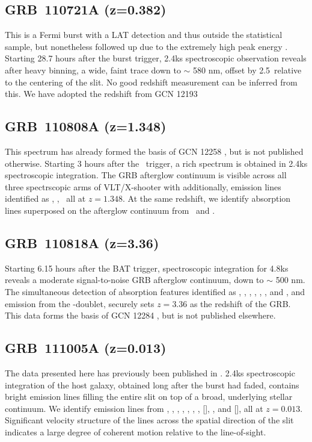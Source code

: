 \documentclass{aa}    %
\begin{document}
\subsection{GRB~110721A (z=0.382)} \label{110721}

This is a Fermi burst with a LAT detection and thus outside the statistical
sample, but nonetheless followed up due to the extremely high peak energy
\citep{Axelsson2012}. Starting 28.7 hours after the burst trigger, 2.4ks
spectroscopic observation reveals after heavy binning, a wide, faint trace down
to $\sim$ 580 nm, offset by 2.5\arcsec~relative to the centering of the slit.
No good redshift measurement can be inferred from this. We have adopted the
redshift from GCN  12193 \citep{GCN12193}


\subsection{GRB~110808A (z=1.348)} \label{110808}

This spectrum has already formed the basis of GCN 12258 \citep{GCN12258}, but is
not published otherwise. Starting 3 hours after the \swift~trigger, a rich
spectrum is obtained in 2.4ks spectroscopic integration. The GRB afterglow
continuum is visible across all three spectrscopic arms of VLT/X-shooter with
additionally, emission lines identified as \oii, \oiii, \ha~all at $z = 1.348$.
At the same redshift, we identify absorption lines superposed on the afterglow
continuum from \mgii~and \feii.

\subsection{GRB~110818A (z=3.36)} \label{110818}

Starting 6.15 hours after the BAT trigger, spectroscopic integration for 4.8ks
reveals a moderate signal-to-noise GRB afterglow continuum, down to $\sim$ 500 nm. The simultaneous detection of absorption features identified as \lya,
\SIii, \civ, \alii, \cah, \cak, and \mgii, and emission from the \oiii-doublet,
securely sets $z = 3.36$ as the redshift of the GRB. This data forms the basis
of GCN 12284 \citep{GCN12284}, but is not published elsewhere.

\subsection{GRB~111005A (z=0.013)} \label{111005}

The data presented here has previously been published in \citet{Michaowski2016}.
2.4ks spectroscopic integration of the host galaxy, obtained long after the
burst had faded, contains bright emission lines filling the entire slit on top
of a broad, underlying stellar continuum. We identify emission lines from \oii,
\hd, \hg, \hb, \oiii, \nii, \hb, [\sii], \ariii, and [\siii], all at $z=0.013$.
Significant velocity structure of the lines across the spatial direction of the
slit indicates a large degree of coherent motion relative to the line-of-sight.
\end{document}
